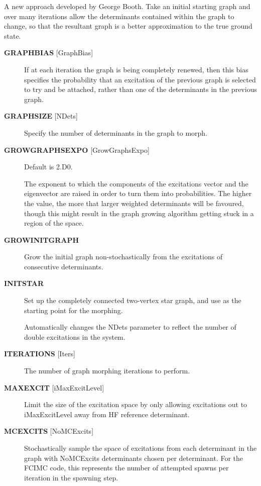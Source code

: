 \documentclass[openany,a4paper,10pt,english]{manual}
\begin{document}
A new approach developed by George Booth.  Take an initial starting graph
and over many iterations allow the determinants contained within the
graph to change, so that the resultant graph is a better approximation
to the true ground state.
\begin{description}
\item[\textbf{GRAPHBIAS} {[}GraphBias{]}] \leavevmode
If at each iteration the graph is being completely renewed, then this
bias specifies the probability that an excitation of the previous
graph is selected to try and be attached, rather than one of the
determinants in the previous graph.

\item[\textbf{GRAPHSIZE} {[}NDets{]}] \leavevmode
Specify the number of determinants in the graph to morph.

\item[\textbf{GROWGRAPHSEXPO} {[}GrowGraphsExpo{]}] \leavevmode
Default is 2.D0.

The exponent to which the components of the excitations vector
and the eigenvector are raised in order to turn them into
probabilities. The higher the value, the more that larger weighted
determinants will be favoured, though this might result in the graph
growing algorithm getting stuck in a region of the space.

\item[\textbf{GROWINITGRAPH}] \leavevmode
Grow the initial graph non-stochastically from the excitations of
consecutive determinants.

\item[\textbf{INITSTAR}] \leavevmode
Set up the completely connected two-vertex star graph, and use as
the starting point for the morphing.

Automatically changes the NDets parameter to reflect the number of
double excitations in the system.

\item[\textbf{ITERATIONS} {[}Iters{]}] \leavevmode
The number of graph morphing iterations to perform.

\item[\textbf{MAXEXCIT} {[}iMaxExcitLevel{]}] \leavevmode
Limit the size of the excitation space by only allowing excitations
out to iMaxExcitLevel away from HF reference determinant.

\item[\textbf{MCEXCITS} {[}NoMCExcits{]}] \leavevmode
Stochastically sample the space of excitations from each determinant in the
graph with NoMCExcits determinants chosen per determinant.
For the FCIMC code, this represents the number of attempted spawns per iteration
in the spawning step.


\end{description}
\end{document}
